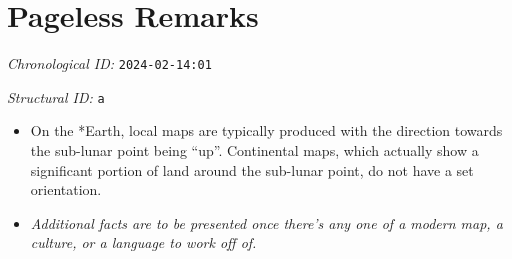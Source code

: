 \section{Pageless Remarks}
\emph{Chronological ID:} \texttt{2024-02-14:01}

\emph{Structural ID:} \texttt{a}

\begin{itemize}
  \item On the *Earth, local maps are typically produced with the direction towards the sub-lunar point being ``up''. Continental maps, which actually show a significant portion of land around the sub-lunar point, do not have a set orientation.
  \item \emph{Additional facts are to be presented once there's any one of a modern map, a culture, or a language to work off of.}
\end{itemize}
\newpage
